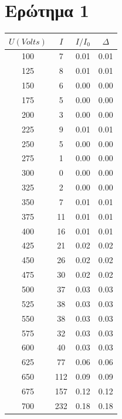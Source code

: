 \documentclass[a4paper,12pt,titlepage]{article}
\begin{document}
\section{Ερώτημα 1}

\begin{center}

\end{center}

\begin{center}

\end{center}

\begin{center}

\end{center}

\begin{table}[h!]
\begin{center}
\begin{tabular}{|c|c|c|c|}
\hline 
$U (Volts)$ & $I$ & $I/I_0$ & $\Delta$\\ 
\hline
100 & 7 & 0.01 & 0.01\\ 
\hline
125&8&0.01&0.01\\
\hline
150&6&0.00&0.00\\
\hline
175&5&0.00&0.00\\
\hline
200&3&0.00&0.00\\
\hline
225&9&0.01&0.01\\
\hline
250&5&0.00&0.00\\
\hline
275&1&0.00&0.00\\
\hline
300&0&0.00&0.00\\
\hline
325&2&0.00&0.00\\
\hline
350&7&0.01&0.01\\
\hline
375&11&0.01&0.01\\
\hline
400&16&0.01&0.01\\
\hline
425&21&0.02&0.02\\
\hline
450&26&0.02&0.02\\
\hline
475&30&0.02&0.02\\
\hline
500&37&0.03&0.03\\
\hline
525&38&0.03&0.03\\
\hline
550&38&0.03&0.03\\
\hline
575&32&0.03&0.03\\
\hline
600&40&0.03&0.03\\
\hline
625&77&0.06&0.06\\
\hline
650&112&0.09&0.09\\
\hline
675&157&0.12&0.12\\
\hline
700&232&0.18&0.18\\

\end{tabular}
\end{center}
\end{table}
\end{document}
